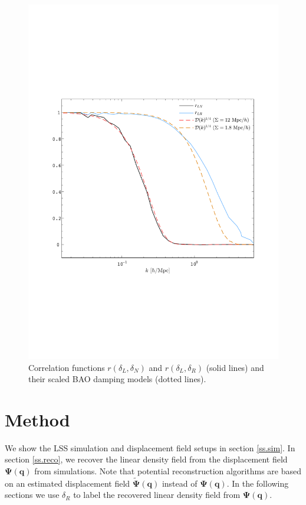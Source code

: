 \documentclass[aps,prd,twocolumn,superscriptaddress,amsfont,amssymb,amsmath,nofootinbib,showpacs,balancelastpage]{revtex4-1}
\newcommand{\bs}{\boldsymbol}
\begin{document}
\begin{figure}[t] \centering
  \includegraphics[width=1.0\linewidth]{filter.pdf}
  \caption{Correlation functions $r(\delta_L,\delta_N)$ and $r(\delta_L,\delta_R)$
  (solid lines) and their scaled BAO damping models (dotted lines).}
  \label{fig.corr}
\end{figure}



\section{Method}\label{sec.method}
We show the LSS simulation and displacement field setups in section \ref{ss.sim}.
In section \ref{ss.reco}, we recover the linear density field from the
displacement field $\bs\Psi(\bs q)$ from simulations.
Note that potential reconstruction algorithms are
based on an estimated displacement field $\tilde{\bs \Psi}(\bs q)$
instead of $\bs\Psi(\bs q)$. In the following sections we
use $\delta_R$ to label the recovered linear density field
from $\bs\Psi(\bs q)$.
\end{document}

